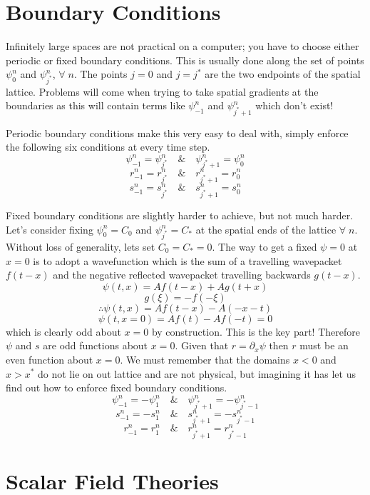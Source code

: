 \documentclass[11pt, oneside]{report}  %
\numberwithin{equation}{section}
\begin{document}
\section{Boundary Conditions}
Infinitely large spaces are not practical on a computer; you have to choose either periodic or fixed boundary conditions. This is usually done along the set of points $\psi^n_0$ and $\psi^n_{j^*}$, $\forall \; n$. The points $j=0$ and $j =j^*$ are the two endpoints of the spatial lattice. Problems will come when trying to take spatial gradients at the boundaries as this will contain terms like $\psi^n_{-1}$ and $\psi^n_{j^* +1}$ which don't exist!

Periodic boundary conditions make this very easy to deal with, simply enforce the following six conditions at every time step.
$$\psi^n_{-1} = \psi^n_{j^*} \quad \& \quad \psi^n_{j^*+1} = \psi^n_0 $$
$$ r^n_{-1} = r^n_{j^*} \quad \& \quad r^n_{j^*+1} = r^n_0 $$
$$ s^n_{-1} = s^n_{j^*} \quad \& \quad s^n_{j^*+1} = s^n_0 $$

Fixed boundary conditions are slightly harder to achieve, but not much harder. Let's consider fixing $\psi^n_0 = C_0$ and $\psi^n_{j^*} = C_*$ at the spatial ends of the lattice $\forall \;n$. Without loss of generality, lets set $C_0 = C_* = 0$. The way to get a fixed $\psi=0$ at $x=0$ is to adopt a wavefunction which is the sum of a travelling wavepacket $f(t-x)$ and the negative reflected wavepacket travelling backwards $g(t-x)$.
$$\psi(t,x) = A f(t-x) + Ag(t+x) $$
$$ g(\xi) = -f(-\xi)$$
$$ \therefore \psi(t,x) = A f(t-x) - A(-x-t)$$
$$ \psi(t,x=0) = A f(t)- A f(-t) = 0$$
which is clearly odd about $x=0$ by construction. This is the key part! Therefore $\psi$ and $s$ are odd functions about $x=0$. Given that $r = \partial_x \psi$ then $r$ must be an even function about $x=0$. We must remember that the domains $x<0$ and $x>x^*$ do not lie on out lattice and are not physical, but imagining it has let us find out how to enforce fixed boundary conditions.
$$ \psi^n_{-1} = - \psi^n_1 \quad \& \quad \psi^n_{j^*+1} = -\psi^n_{j^*-1}$$
$$ s^n_{-1} = - s^n_1 \quad \& \quad s^n_{j^*+1} = -s^n_{j^*-1}$$
$$ r^n_{-1} = r^n_1 \quad \& \quad r^n_{j^*+1} = r^n_{j^*-1}$$






\section{Scalar Field Theories}
\end{document}
